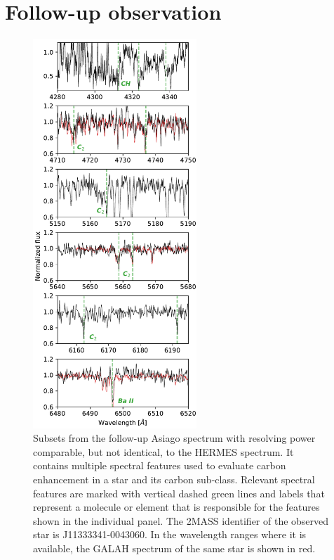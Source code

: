 \section{Follow-up observation}
\label{sec:asiago_cemp}

\begin{figure}
	\centering
	\includegraphics[width=0.55\textwidth]{asiago_cemp2.pdf}
	\caption{Subsets from the follow-up Asiago spectrum with resolving power comparable, but not identical, to the HERMES spectrum. It contains multiple spectral features used to evaluate carbon enhancement in a star and its carbon sub-class. Relevant spectral features are marked with vertical dashed green lines and labels that represent a molecule or element that is responsible for the features shown in the individual panel. The 2MASS identifier of the observed star is J11333341-0043060. In the wavelength ranges where it is available, the GALAH spectrum of the same star is shown in red.}
	\label{fig:asiago}
\end{figure}


